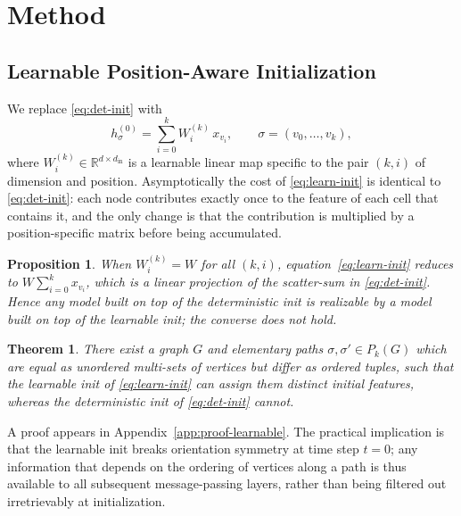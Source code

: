 \documentclass[letterpaper]{article} %
\newtheorem{proposition}[definition]{Proposition}
\newtheorem{theorem}[definition]{Theorem}
\begin{document}
\section{Method} \label{section:method}

\subsection{Learnable Position-Aware Initialization} \label{subsec:learnable-init}
We replace \eqref{eq:det-init} with
\begin{equation}
    h_\sigma^{(0)} = \sum_{i=0}^{k} W_i^{(k)} \, x_{v_i}, \qquad \sigma = (v_0, \ldots, v_k), \label{eq:learn-init}
\end{equation}
where \(W_i^{(k)} \in \mathbb{R}^{d \times d_\text{in}}\) is a learnable linear map specific to the pair \((k, i)\) of dimension and position. Asymptotically the cost of \eqref{eq:learn-init} is identical to \eqref{eq:det-init}: each node contributes exactly once to the feature of each cell that contains it, and the only change is that the contribution is multiplied by a position-specific matrix before being accumulated.

\begin{proposition}\label{prop:learnable-subsumes-det}
    When \(W_i^{(k)} = W\) for all \((k, i)\), equation~\eqref{eq:learn-init} reduces to \(W \sum_{i=0}^{k} x_{v_i}\), which is a linear projection of the scatter-sum in \eqref{eq:det-init}. Hence any model built on top of the deterministic init is realizable by a model built on top of the learnable init; the converse does not hold.
\end{proposition}

\begin{theorem} \label{thm:learnable-breaks-symmetry}
    There exist a graph \(G\) and elementary paths \(\sigma, \sigma' \in P_k(G)\) which are equal as unordered multi-sets of vertices but differ as ordered tuples, such that the learnable init of \eqref{eq:learn-init} can assign them distinct initial features, whereas the deterministic init of \eqref{eq:det-init} cannot.
\end{theorem}
A proof appears in Appendix~\ref{app:proof-learnable}. The practical implication is that the learnable init breaks orientation symmetry at time step \(t = 0\); any information that depends on the ordering of vertices along a path is thus available to all subsequent message-passing layers, rather than being filtered out irretrievably at initialization.
\end{document}
